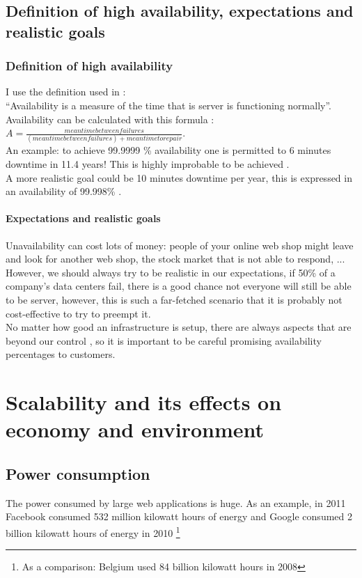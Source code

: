 \documentclass[12pt]{report}
\begin{document}
\section{Definition of high availability, expectations and realistic
  goals}
\subsection{Definition of high availability}
I use the definition used in \cite{ha_book}:\\
``Availability is a measure of the time that is server is functioning
normally''.\\
Availability can be calculated with this formula \cite{ha_book}:
$A=\frac{mean time between failures}{(mean time between failures) +
  mean time to repair}$.\\
An example: to achieve 99.9999 \% availability one is permitted to 6
minutes downtime in 11.4 years! This is highly improbable to be
achieved \cite{ha_book}.\\
A more realistic goal could be 10 minutes downtime per year, this is
expressed in an availability of 99.998\% \cite{ha_book}.

\subsubsection{Expectations and realistic goals}
Unavailability can cost lots of money: people of your online web shop
might leave and look for another web shop, the stock market that is not
able to respond, ...\\
However, we should always try to be realistic in our expectations, if 50\%
of a company's data centers fail, there is a good chance not everyone
will still be able to be server, however, this is such a far-fetched
scenario that it is probably not cost-effective to try to preempt
it.\\
No matter how good an infrastructure is setup, there are always
aspects that are beyond our control \cite{black_swan}, so it is
important to be careful promising availability percentages to
customers. 

\chapter{Scalability and its effects on economy and environment}
\section{Power consumption}
The power consumed by large web applications is huge. As an
example, in 2011 Facebook consumed 532 million kilowatt hours of
energy and Google consumed 2 billion kilowatt hours of
energy in 2010 \cite{datacenter_power} \footnote{As a comparison:
  Belgium used 84 billion kilowatt hours in 2008}
\end{document}
